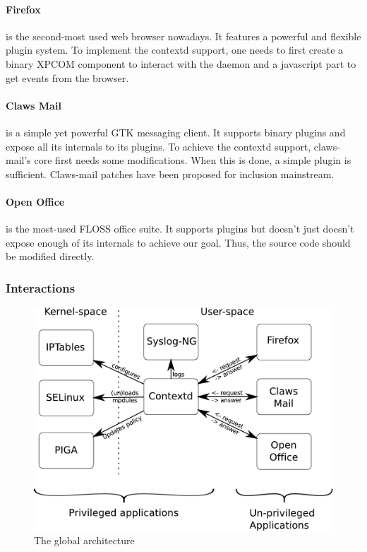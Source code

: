 \documentclass[conference]{IEEEtran}
\begin{document}
			\paragraph*{Firefox} is the second-most used web browser nowadays. It features a powerful and flexible plugin system. 
			To implement the contextd support, one needs to first create a binary XPCOM component to interact with the daemon and a javascript part to get events from the browser. 

			\paragraph*{Claws Mail} is a simple yet powerful GTK messaging client. It supports binary plugins and expose all its internals to its plugins.
			To achieve the contextd support, claws-mail's core first needs some modifications. When this is done, a simple plugin is sufficient. Claws-mail patches have been proposed for inclusion mainstream.

			\paragraph*{Open Office} is the most-used FLOSS office suite. It supports plugins but doesn't just doesn't expose enough of its internals to achieve our goal. 
			Thus, the source code should be modified directly.

		\subsubsection{Interactions}
			\begin{figure}[h]
				\centering
				\includegraphics[scale=0.5]{architecture.pdf}
				\caption{The global architecture}
				\label{architecture}
			\end{figure}
\end{document}
